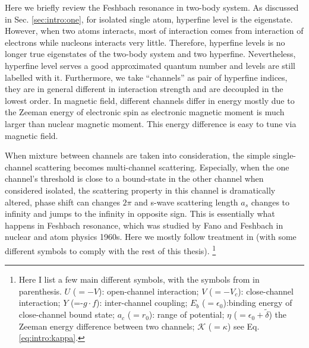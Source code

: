 Here we briefly review the Feshbach resonance in two-body system.   As discussed in Sec. \ref{sec:intro:one}, for isolated single atom, hyperfine level is the eigenstate.  However, when two atoms interacts, most of interaction comes from interaction of electrons while nucleons interacts very little.  Therefore, hyperfine levels is no longer true eigenstates of the two-body system and two hyperfine.  Nevertheless, hyperfine level serves a good approximated quantum number and levels are still labelled with it. Furthermore, we take ``channels'' as pair of hyperfine indices, they are in general different in interaction strength and are decoupled in the lowest order.  In magnetic field, different channels differ in energy mostly due to the Zeeman energy of electronic spin as electronic magnetic moment is much larger than nuclear magnetic moment.  This energy difference is easy to tune via magnetic field.  

When mixture between channels are taken into consideration, the simple single-channel scattering becomes multi-channel scattering.  Especially, when the one channel's threshold is close to a bound-state in the other channel when considered isolated, the scattering property in this channel is dramatically altered,  phase shift can changes $2\pi$ and s-wave scattering length $a_{s}$ changes to infinity and jumps to the infinity in opposite sign.  This is essentially what happens in Feshbach resonance, which was studied by Fano\cite{Fano} and Feshbach \cite{nuclear}  in nuclear and atom physics 1960s.  Here we  mostly follow treatment in \cite{Leggett} (with some different symbols to comply with the rest of this thesis). 
\footnote{Here I list a few main different symbols, with the symbols from \cite{Leggett} in parenthesis.  $U$ ($=-V$): open-channel interaction; $V$ ($=-V_{c}$): close-channel interaction; $Y$ (=-$g\cdot{}f$): inter-channel coupling; $E_{b}$ ($=\epsilon_{0}$):binding energy of close-channel bound state; $a_{c}$ ($=r_{0}$): range of potential; $\eta$ ($=\epsilon_0+\tilde\delta$) the Zeeman energy difference between two channels; $\mathcal{K}$ ($=\kappa$) see Eq.\ref{eq:intro:kappa}.}


